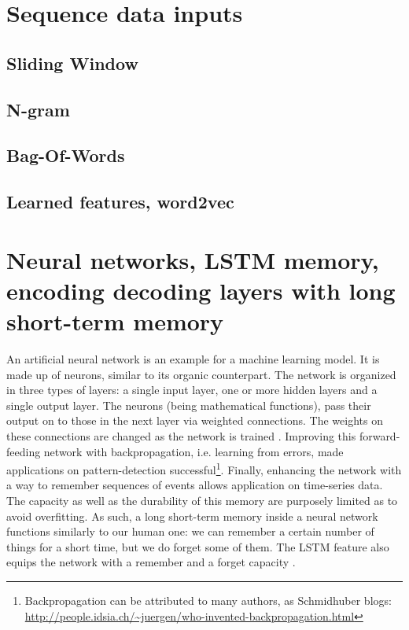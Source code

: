 \section{Sequence data inputs}
\subsection{Sliding Window}
\subsection{N-gram}
\subsection{Bag-Of-Words}
\subsection{Learned features, word2vec}

\section{Neural networks, LSTM memory, encoding decoding layers with long short-term memory} An artificial neural network is an example for a machine learning model. It is made up of neurons, similar to its organic counterpart. The network is organized in three types of layers: a single input layer, one or more hidden layers and a single output layer.
The neurons (being mathematical functions), pass their output on to those in the next layer via weighted connections. The weights on these connections are changed as the network is trained \cite{rosenblatt1958}.
Improving this forward-feeding network with backpropagation, i.e. learning from errors, made applications on pattern-detection successful\footnote{Backpropagation can be attributed to many authors, as Schmidhuber blogs: \url{http://people.idsia.ch/~juergen/who-invented-backpropagation.html}}.
Finally, enhancing the network with a way to remember sequences of events allows application on time-series data. The capacity as well as the durability of this memory are purposely limited as to avoid overfitting.
As such, a long short-term memory inside a neural network functions similarly to our human one: we can remember a certain number of things for a short time, but we do forget some of them.
The LSTM feature also equips the network with a remember and a forget capacity \cite{hochreiter1997}.